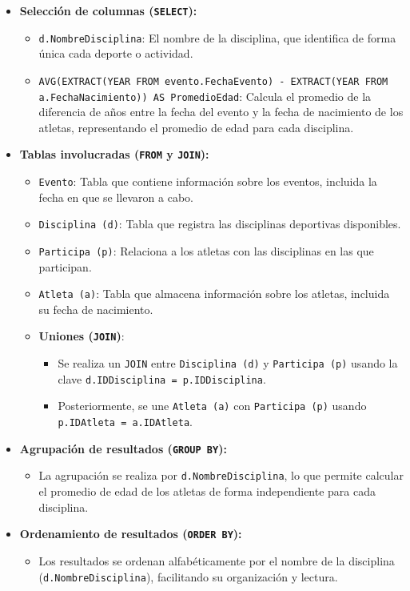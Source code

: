 \begin{itemize} \item \textbf{Selección de columnas (\texttt{SELECT}):} \begin{itemize} \item \texttt{d.NombreDisciplina}: El nombre de la disciplina, que identifica de forma única cada deporte o actividad. \item \texttt{AVG(EXTRACT(YEAR FROM evento.FechaEvento) - EXTRACT(YEAR FROM a.FechaNacimiento)) AS PromedioEdad}: Calcula el promedio de la diferencia de años entre la fecha del evento y la fecha de nacimiento de los atletas, representando el promedio de edad para cada disciplina. \end{itemize}
	
	\item \textbf{Tablas involucradas (\texttt{FROM} y \texttt{JOIN}):} \begin{itemize} \item \texttt{Evento}: Tabla que contiene información sobre los eventos, incluida la fecha en que se llevaron a cabo. \item \texttt{Disciplina (d)}: Tabla que registra las disciplinas deportivas disponibles. \item \texttt{Participa (p)}: Relaciona a los atletas con las disciplinas en las que participan. \item \texttt{Atleta (a)}: Tabla que almacena información sobre los atletas, incluida su fecha de nacimiento. \item \textbf{Uniones (\texttt{JOIN})}: \begin{itemize} \item Se realiza un \texttt{JOIN} entre \texttt{Disciplina (d)} y \texttt{Participa (p)} usando la clave \texttt{d.IDDisciplina = p.IDDisciplina}. \item Posteriormente, se une \texttt{Atleta (a)} con \texttt{Participa (p)} usando \texttt{p.IDAtleta = a.IDAtleta}. \end{itemize} \end{itemize}
	
	\item \textbf{Agrupación de resultados (\texttt{GROUP BY}):} \begin{itemize} \item La agrupación se realiza por \texttt{d.NombreDisciplina}, lo que permite calcular el promedio de edad de los atletas de forma independiente para cada disciplina. \end{itemize}
	
	\item \textbf{Ordenamiento de resultados (\texttt{ORDER BY}):} \begin{itemize} \item Los resultados se ordenan alfabéticamente por el nombre de la disciplina (\texttt{d.NombreDisciplina}), facilitando su organización y lectura. \end{itemize} \end{itemize}

